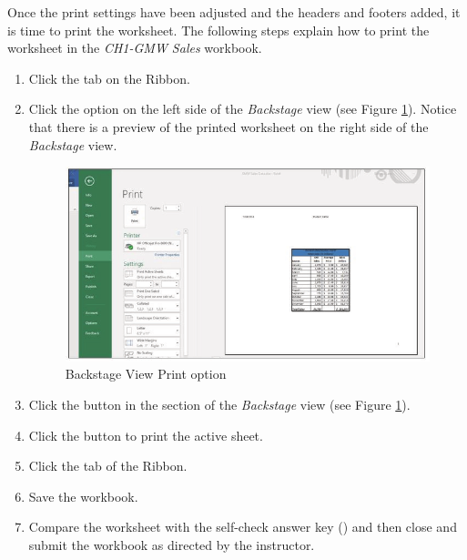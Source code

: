Once the print settings have been adjusted and the headers and footers added, it is time to print the worksheet. The following steps explain how to print the worksheet in the \textit{CH1-GMW Sales} workbook.

\begin{enumbox}
	\begin{enumerate}
		\item Click the  tab on the Ribbon.
		\item Click the  option on the left side of the \textit{Backstage} view (see Figure \ref{01:fig52}). Notice that there is a preview of the printed worksheet on the right side of the \textit{Backstage} view.

		\begin{figure}[H]
			\centering
			\includegraphics[width=\maxwidth{.95\linewidth}]{gfx/ch01_fig52}
			\caption{Backstage View Print option}
			\label{01:fig52}
		\end{figure}

		\item Click the  button in the  section of the \textit{Backstage} view (see Figure \ref{01:fig52}).
		\item Click the  button to print the active sheet.
		\item Click the  tab of the Ribbon.
		\item Save the  workbook.
		\item Compare the worksheet with the self-check answer key () and then close and submit the  workbook as directed by the instructor.
	\end{enumerate}
\end{enumbox}
	
